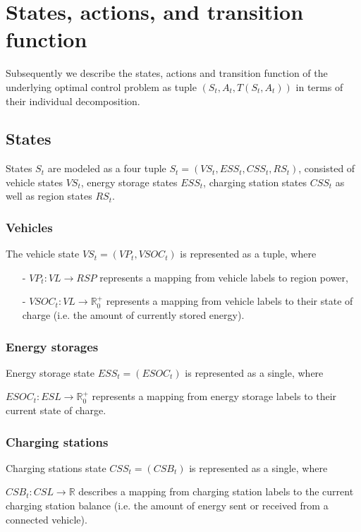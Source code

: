 \section{States, actions, and transition function}
Subsequently we describe the states, actions and transition function of the underlying optimal control problem as tuple $(S_t, A_t, T(S_t, A_t))$ in terms of their individual decomposition.

\subsection{States}
States $S_t$ are modeled as a four tuple $
	S_t = (VS_t, ESS_t, CSS_t, RS_t)
$, consisted of vehicle states $VS_t$, energy storage states $ESS_t$, charging station states $CSS_t$ as well as region states $RS_t$.

\subsubsection{Vehicles}
The vehicle state $
	VS_t = (VP_t, VSOC_t)
$ is represented as a tuple, where
\begin{itemize}
	\item[-] $VP_t: VL \rightarrow RSP$ represents a mapping from vehicle labels to region power,
	\item[-] $VSOC_t: VL \rightarrow \mathbb{R}_0^+$ represents a mapping from vehicle labels to their state of charge (i.e. the amount of currently stored energy).
\end{itemize}

\subsubsection{Energy storages}
Energy storage state
$
	ESS_t = (ESOC_t)
$ is represented as a single, where

$ESOC_t: ESL \rightarrow \mathbb{R}_0^+$ represents a mapping from energy storage labels to their current state of charge. 

\subsubsection{Charging stations}
Charging stations state
$
	CSS_t = (CSB_t)
$ is represented as a single, where

$
	CSB_t: CSL \rightarrow \mathbb{R}
$ describes a mapping from charging station labels to the current charging station balance (i.e. the amount of energy sent or received from a connected vehicle).

